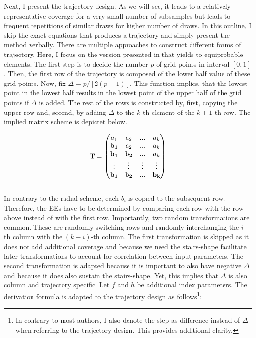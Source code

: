 \documentclass[a4paper,12pt]{article}
\begin{document}
\noindent
Next, I present the trajectory design. As we will see, it leads to a relatively representative coverage for a very small number of subsamples but leads to frequent repetitions of similar draws for higher number of draws.
In this outline, I skip the exact equations that produces a trajectory and simply present the method verbally.
There are multiple approaches to construct different forms of trajectory. Here, I focus on the version presented in \cite{Morris.1991} that yields to equiprobable elements. The first step is to decide the number $p$ of grid points in interval $[0,1]$. Then, the first row of the trajectory is composed of the lower half value of these grid points. Now, fix $\Delta = p/[2(p-1)]$. This function implies, that the lowest point in the lowest half results in the lowest point of the upper half of the grid points if $\Delta$ is added. The rest of the rows is constructed by, first, copying the upper row and, second, by adding $\Delta$ to the $k$-th element of the $k+1$-th row. The implied matrix scheme is depictet below.

$$\bold{T} =
\begin{pmatrix}
a_1 & a_2 & ... & a_k \\
\bold{b_1} & a_2 & ... & a_k \\
\bold{b_1} & \bold{b_2} & ... & a_k \\
\vdots & \vdots & \vdots & \vdots\\

\bold{b_1} & \bold{b_2} & ... & \bold{b_k}
\end{pmatrix}
$$
\\

\noindent
In contrary to the radial scheme, each $b_i$ is copied to the subsequent row. Therefore, the EEs have to be determined by comparing each row with the row above instead of with the first row.
Importantly, two random transformations are common. These are randomly switching rows and randomly interchanging the $i$-th column with the $(k-i)$-th column. The first transformation is skipped as it does not add additional coverage and because we need the stairs-shape facilitate later transformations to account for correlation between input parameters. The second transformation is adapted because it is important to also have negative $\Delta$ and because it does also sustain the stairs-shape. Yet, this implies that $\Delta$ is also column and trajectory specific. Let $f$ and $h$ be additional index parameters. The derivation formula is adapted to the trajectory design as follows\footnote{In contrary to most authors, I also denote the step as difference instead of $\Delta$ when referring to the trajectory design. This provides additional clarity.}:
\end{document}
